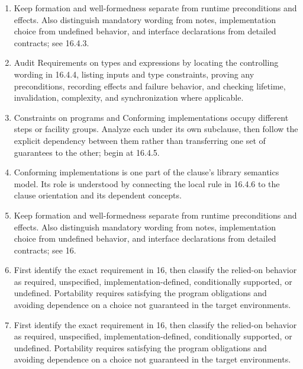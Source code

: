\documentclass[11pt,letterpaper]{article}
\begin{document}
\begin{enumerate}
\item Keep formation and well-formedness separate from runtime preconditions and effects. Also distinguish mandatory wording from notes, implementation choice from undefined behavior, and interface declarations from detailed contracts; see 16.4.3.
\item Audit Requirements on types and expressions by locating the controlling wording in 16.4.4, listing inputs and type constraints, proving any preconditions, recording effects and failure behavior, and checking lifetime, invalidation, complexity, and synchronization where applicable.
\item Constraints on programs and Conforming implementations occupy different steps or facility groups. Analyze each under its own subclause, then follow the explicit dependency between them rather than transferring one set of guarantees to the other; begin at 16.4.5.
\item Conforming implementations is one part of the clause's library semantics model. Its role is understood by connecting the local rule in 16.4.6 to the clause orientation and its dependent concepts.
\item Keep formation and well-formedness separate from runtime preconditions and effects. Also distinguish mandatory wording from notes, implementation choice from undefined behavior, and interface declarations from detailed contracts; see 16.
\item First identify the exact requirement in 16, then classify the relied-on behavior as required, unspecified, implementation-defined, conditionally supported, or undefined. Portability requires satisfying the program obligations and avoiding dependence on a choice not guaranteed in the target environments.
\item First identify the exact requirement in 16, then classify the relied-on behavior as required, unspecified, implementation-defined, conditionally supported, or undefined. Portability requires satisfying the program obligations and avoiding dependence on a choice not guaranteed in the target environments.
\end{enumerate}
\end{document}
